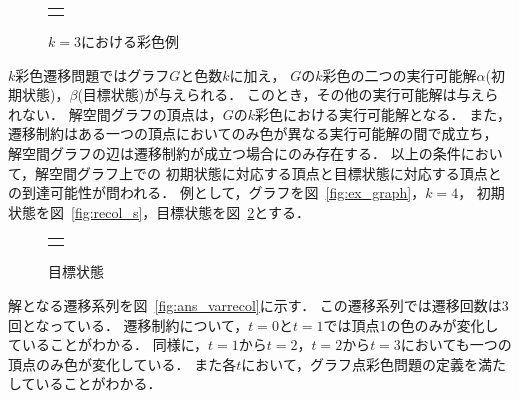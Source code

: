 \begin{figure}[htbp]
  \centering
  \begin{tabular}{c}
    
    \begin{minipage}{0.45\hsize}
      \centering
      
      \caption{グラフ}
      \label{fig:ex_graph}
    \end{minipage}

    \begin{minipage}{0.45\hsize}
      \centering
      
      \caption{$k=3$における彩色例}
      \label{fig:graph_col}
    \end{minipage}

  \end{tabular}  
\end{figure}

$k$彩色遷移問題ではグラフ$G$と色数$k$に加え，
$G$の$k$彩色の二つの実行可能解$\alpha$(初期状態)，$\beta$(目標状態)が与えられる． 
このとき，その他の実行可能解は与えられない． 
解空間グラフの頂点は，$G$の$k$彩色における実行可能解となる．
また，遷移制約はある一つの頂点においてのみ色が異なる実行可能解の間で成立ち，
解空間グラフの辺は遷移制約が成立つ場合にのみ存在する．
以上の条件において，解空間グラフ上での
初期状態に対応する頂点と目標状態に対応する頂点との到達可能性が問われる． 
例として，グラフを図~\ref{fig:ex_graph}，$k=4$，
初期状態を図~\ref{fig:recol_s}，目標状態を図~\ref{fig:recol_g}とする．

\begin{figure}[htbp]
  \centering
  \begin{tabular}{c}

    \begin{minipage}{0.45\hsize}
      \centering
      
      \caption{初期状態}
      \label{fig:recol_s}
    \end{minipage}

    \begin{minipage}{0.45\hsize}
      \centering
      
      \caption{目標状態}
      \label{fig:recol_g}
    \end{minipage}
    
  \end{tabular}
\end{figure}

解となる遷移系列を図~\ref{fig:ans_varrecol}に示す．
この遷移系列では遷移回数は3回となっている．
遷移制約について，$t=0$と$t=1$では頂点1の色のみが変化していることがわかる． 
同様に，$t=1$から$t=2$，$t=2$から$t=3$においても一つの頂点のみ色が変化している． 
また各$t$において，グラフ点彩色問題の定義を満たしていることがわかる．

